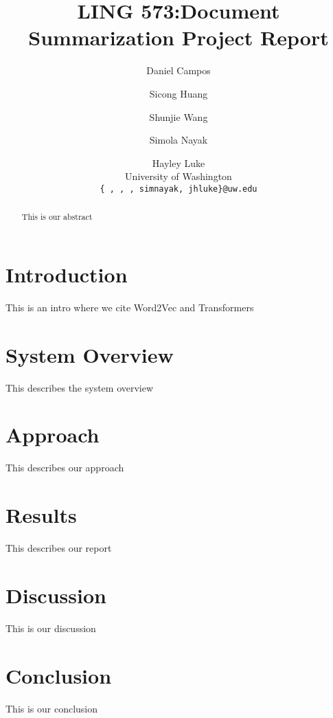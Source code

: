 \documentclass[11pt]{article}
\title{LING 573:Document Summarization Project Report}
\author{Daniel Campos \and Sicong Huang \and Shunjie Wang \and Simola Nayak \and Hayley Luke \\ University of Washington \\ {\tt \{ , , , simnayak, jhluke\}@uw.edu}}
\date{}
\begin{document}
\maketitle
\begin{abstract}
This is our abstract
\end{abstract}
\section{Introduction}
This is an intro where we cite Word2Vec \cite{Mikolov2013DistributedRO} and Transformers \cite{Wolf2019HuggingFacesTS}
\section{System Overview}
This describes the system overview
\section{Approach}
This describes our approach
\section{Results}
This describes our report
\section{Discussion}
This is our discussion
\section{Conclusion}
This is our conclusion


\end{document}
